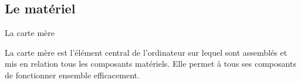 \subsection{Le matériel}
\begin{frame}{La carte mère}
  \centerline{%
  }

  La carte mère est l'élément central de l'ordinateur sur lequel sont
  assemblés et mis en relation tous les composants matériels. Elle
  permet à tous ses composants de fonctionner ensemble efficacement.
\end{frame}

